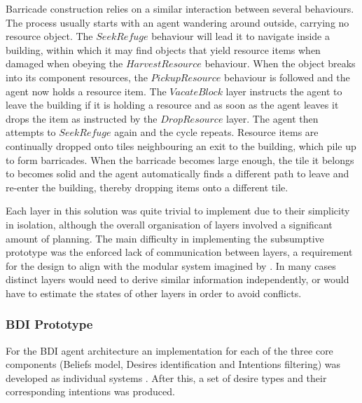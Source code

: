 \documentclass[a4paper,12pt]{article}
\begin{document}
Barricade construction relies on a similar interaction between several behaviours. The process usually starts with an agent wandering around outside, carrying no resource object. The $SeekRefuge$ behaviour will lead it to navigate inside a building, within which it may find objects that yield resource items when damaged when obeying the $HarvestResource$ behaviour. When the object breaks into its component resources, the $PickupResource$ behaviour is followed and the agent now holds a resource item. The $VacateBlock$ layer instructs the agent to leave the building if it is holding a resource and as soon as the agent leaves it drops the item as instructed by the $DropResource$ layer. The agent then attempts to $SeekRefuge$ again and the cycle repeats. Resource items are continually dropped onto tiles neighbouring an exit to the building, which pile up to form barricades. When the barricade becomes large enough, the tile it belongs to becomes solid and the agent automatically finds a different path to leave and re-enter the building, thereby dropping items onto a different tile.

Each layer in this solution was quite trivial to implement due to their simplicity in isolation, although the overall organisation of layers involved a significant amount of planning. The main difficulty in implementing the subsumptive prototype was the enforced lack of communication between layers, a requirement for the design to align with the modular system imagined by . In many cases distinct layers would need to derive similar information independently, or would have to estimate the states of other layers in order to avoid conflicts.

\subsubsection{BDI Prototype}\noindent
For the BDI agent architecture an implementation for each of the three core components (Beliefs model, Desires identification and Intentions filtering) was developed as individual systems \cite{rao95}. After this, a set of desire types and their corresponding intentions was produced.
\end{document}
